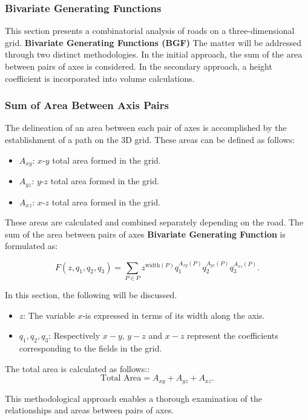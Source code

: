 \documentclass{article}
\begin{document}
\subsubsection{Bivariate Generating Functions}
\label{sec:bivariate}

This section presents a combinatorial analysis of roads on a three-dimensional grid. \textbf{Bivariate Generating Functions (BGF)} The matter will be addressed through two distinct methodologies. In the initial approach, the sum of the area between pairs of axes is considered. In the secondary approach, a height coefficient is incorporated into volume calculations.

\subsubsection{Sum of Area Between Axis Pairs}

The delineation of an area between each pair of axes is accomplished by the establishment of a path on the 3D grid. These areas can be defined as follows:
\begin{itemize}
    \item \( A_{xy} \): \(x\)-\(y\) total area formed in the grid.
    \item \( A_{yz} \): \(y\)-\(z\) total area formed in the grid.
    \item \( A_{xz} \): \(x\)-\(z\) total area formed in the grid.
\end{itemize}

These areas are calculated and combined separately depending on the road. The sum of the area between pairs of axes \textbf{Bivariate Generating Function} is formulated as:

\[
F(z, q_1, q_2, q_3) = \sum_{P \in P} z^{\text{width}(P)} q_1^{A_{xy}(P)} q_2^{A_{yz}(P)} q_3^{A_{xz}(P)}.
\]

In this section, the following will be discussed.
\begin{itemize}
    \item \(z\): The variable \(x\)-is expressed in terms of its width along the axis.
    \item \(q_1, q_2, q_3\): Respectively \(x-y\), \(y-z\) and \(x-z\) represent the coefficients corresponding to the fields in the grid.
\end{itemize}

The total area is calculated as follows::
\[
\text{Total Area} = A_{xy} + A_{yz} + A_{xz}.
\]

This methodological approach enables a thorough examination of the relationships and areas between pairs of axes.
\end{document}
